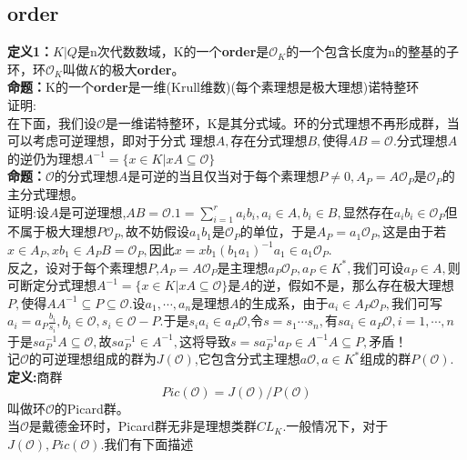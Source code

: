 \documentclass[UTF8]{article}
\begin{document}
    \subsection{order}
    \textbf{定义1：}$K|Q$是n次代数数域，K的一个\textbf{order}是$\mathcal{O}_{K}$的一个包含长度为n的整基的子环，环$\mathcal{O}_{K}$叫做$K$的极大\textbf{order}。\\
    \textbf{命题：}K的一个\textbf{order}是一维(Krull维数)(每个素理想是极大理想)诺特整环\\
    证明:\\
    在下面，我们设$\mathcal{O}$是一维诺特整环，K是其分式域。环的分式理想不再形成群，当可以考虑可逆理想，即对于分式 理想$A,$存在分式理想$B,$使得$AB=\mathcal{O}.$分式理想$A$的逆仍为理想$A^{-1}=\{x\in K|xA\subseteq \mathcal{O}\}$\\
     \textbf{命题：}$\mathcal{O}$的分式理想$A$是可逆的当且仅当对于每个素理想$P\neq 0,$$A_{P}=A\mathcal{O}_{P}$是$\mathcal{O}_{P}$的主分式理想。\\
    证明:设$A$是可逆理想,$AB=\mathcal{O}.$$1=\sum _{i=1}^{r}a_{i}b_{i},a_{i}\in A,b_{i}\in B,$显然存在$a_{i}b_{i}\in \mathcal{O}_{P}$但不属于极大理想$P\mathcal{O}_{P},$故不妨假设$a_{1}b_{1}$是$\mathcal{O}_{P}$的单位，于是$A_{P}=a_{1}\mathcal{O}_{P},$这是由于若$x\in A_{P},xb_{1}\in A_{P}B=\mathcal{O}_{P},$因此$x=xb_{1}(b_{1}a_{1})^{-1}a_{1}\in a_{1}\mathcal{O}_{P}.$\\
    反之，设对于每个素理想$P$,$A_{P}=A\mathcal{O}_{P}$是主理想$a_{P}\mathcal{O}_{P},a_{P}\in K^{*},$我们可设$a_{P}\in A,$则可断定分式理想$A^{-1}=\{x\in K|xA\subseteq \mathcal{O}\}$是$A$的逆，假如不是，那么存在极大理想$P,$使得$AA^{-1}\subseteq P\subseteq \mathcal{O}.$设$a_{1},\cdots ,a_{n}$是理想$A$的生成系，由于$a_{i}\in A_{P}\mathcal{O}_{P},$我们可写$a_{i}=a_{P}\frac{b_{i}}{s_{i}},b_{i}\in \mathcal{O},s_{i}\in \mathcal{O}-P.$于是$s_{i}a_{i}\in a_{P}\mathcal{O}$,令$s=s_{1}\cdots s_{n},$有$sa_{i}\in a_{P}\mathcal{O},i=1,\cdots ,n$于是$sa_{P}^{-1}A\subseteq \mathcal{O},$故$sa_{P}^{-1}\in A^{-1},$这将导致$s=sa_{P}^{-1}a_{P}\in A^{-1}A\subseteq P,$矛盾！\\
   记$\mathcal{O}$的可逆理想组成的群为$J(\mathcal{O})$,它包含分式主理想$a\mathcal{O},a\in K^{*}$组成的群$P(\mathcal{O}).$\\
    \textbf{定义:}商群$$
    Pic(\mathcal{O})=J(\mathcal{O})/P(\mathcal{O})
    $$叫做环$\mathcal{O}$的Picard群。\\
    当$\mathcal{O}$是戴德金环时，Picard群无非是理想类群$CL_{K}.$一般情况下，对于$J(\mathcal{O}),Pic(\mathcal{O}).$我们有下面描述\\
\end{document}
